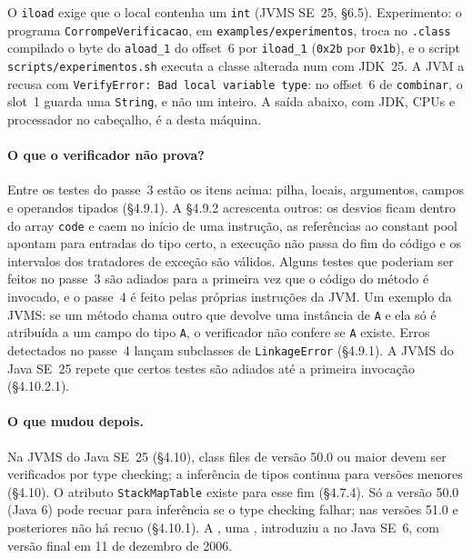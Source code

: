 


O \texttt{iload} exige que o local contenha um \texttt{int} (JVMS
SE~25, §6.5). Experimento: o programa \texttt{CorrompeVerificacao}, em
\texttt{examples/experimentos}, troca no \texttt{.class} compilado o
byte do \texttt{aload\_1} do offset~6 por \texttt{iload\_1}
(\texttt{0x2b} por \texttt{0x1b}), e o script
\texttt{scripts/experimentos.sh} executa a classe alterada num
 com JDK~25. A JVM a recusa com
\texttt{VerifyError: Bad local variable type}: no offset~6 de \texttt{combinar}, o slot~1 guarda uma
\texttt{String}, e não um inteiro. A saída abaixo, com JDK, CPUs e
processador no cabeçalho, é a desta máquina.



\paragraph{O que o verificador não prova?}
Entre os testes do passe~3 estão os itens acima: pilha, locais,
argumentos, campos e operandos tipados (§4.9.1). A §4.9.2 acrescenta
outros: os desvios ficam dentro do array \texttt{code} e caem no início
de uma instrução, as referências ao constant pool apontam para entradas
do tipo certo, a execução não passa do fim do código e os intervalos dos
tratadores de exceção são válidos. Alguns testes que
poderiam ser feitos no passe~3 são adiados para a primeira vez que o
código do método é invocado, e o passe~4 é feito pelas próprias
instruções da JVM. Um exemplo da JVMS: se um método chama outro que
devolve uma instância de \texttt{A} e ela só é atribuída a um campo do
tipo \texttt{A}, o verificador não confere se \texttt{A} existe. Erros
detectados no passe~4 lançam subclasses de \texttt{LinkageError}
(§4.9.1). A JVMS do Java SE~25 repete que certos testes são adiados até
a primeira invocação (§4.10.2.1).

\paragraph{O que mudou depois.}
Na JVMS do Java SE~25 (§4.10), class files de versão 50.0 ou maior
devem ser verificados por type checking; a inferência de tipos
continua para versões menores (§4.10). O atributo \texttt{StackMapTable} existe para esse fim
(§4.7.4). Só a versão 50.0 (Java 6) pode recuar para inferência se o
type checking falhar; nas versões 51.0 e posteriores não há recuo
(§4.10.1). A , uma , introduziu a  no Java SE~6, com versão final em 11 de dezembro de 2006.

